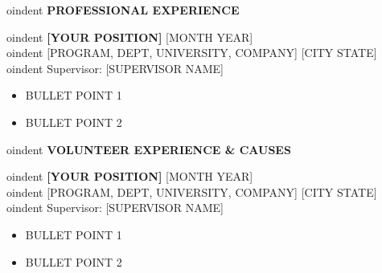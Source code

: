 \documentclass[12pt]{article}
\begin{document}

\begin{center}
	{
oindent \bfseries PROFESSIONAL EXPERIENCE}
\end{center} 

\vspace{8pt} %


oindent
{\bfseries [YOUR POSITION]} \hfill [MONTH YEAR] \\ 

oindent [PROGRAM, DEPT, UNIVERSITY, COMPANY] \hfill [CITY STATE] \\ 

oindent Supervisor: [SUPERVISOR NAME]

\vspace{6pt}
\begin{itemize} \itemsep -2pt %
	\item BULLET POINT 1
	\item BULLET POINT 2
\end{itemize}

\vspace{0.2in} %


\begin{center}
	{
oindent \bfseries VOLUNTEER EXPERIENCE \& CAUSES}
\end{center}

\vspace{8pt} %


oindent
{\bfseries [YOUR POSITION]} \hfill [MONTH YEAR] \\ 

oindent [PROGRAM, DEPT, UNIVERSITY, COMPANY] \hfill [CITY STATE] \\ 

oindent Supervisor: [SUPERVISOR NAME]

\vspace{6pt}
\begin{itemize} \itemsep -2pt %
	\item BULLET POINT 1
	\item BULLET POINT 2
\end{itemize}

\vspace{0.2in} %
\end{document}
